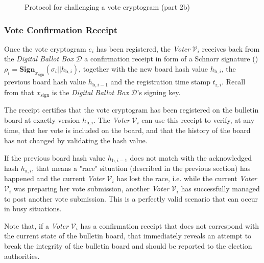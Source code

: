 \begin{landscape}
\begin{figure}[ht]
    \caption{Protocol for challenging a vote cryptogram (part 2b)}
    \label{fig: protocol for challenging a vote cryptogram part 2b}
\end{figure}
\clearpage
\end{landscape}


\clearpage
\subsubsection{Vote Confirmation Receipt} \label{sec: vote confirmation receipt}
Once the vote cryptogram $e_i$ has been registered, the \textit{Voter} $\mathcal{V}_i$ receives back from the \textit{Digital Ballot Box} $\mathcal{D}$ a confirmation receipt in form of a Schnorr signature () \( \rho_i = \mathbf{Sign}_{x_\mathrm{sign}} (\sigma_i || h_{\mathrm{b},i}) \), together with the new board hash value $h_{\mathrm{b},i}$, the previous board hash value $h_{\mathrm{b},i-1}$ and the registration time stamp $t_{\mathrm{r},i}$. Recall from  that $x_\mathrm{sign}$ is the \textit{Digital Ballot Box} $\mathcal{D}$'s signing key.

The receipt certifies that the vote cryptogram has been registered on the bulletin board at exactly version $h_{\mathrm{b},i}$. The \textit{Voter} $\mathcal{V}_i$ can use this receipt to verify, at any time, that her vote is included on the board, and that the history of the board has not changed by validating the hash value. 

If the previous board hash value $h_{\mathrm{b},i-1}$ does not match with the acknowledged hash $h_{\mathrm{a},i}$, that means a "race" situation (described in the previous section) has happened and the current \textit{Voter} $\mathcal{V}_i$ has lost the race, i.e. while the current \textit{Voter} $\mathcal{V}_i$ was preparing her vote submission, another \textit{Voter} $\mathcal{V}_i$ has successfully managed to post another vote submission. This is a perfectly valid scenario that can occur in busy situations.

Note that, if a \textit{Voter} $\mathcal{V}_i$ has a confirmation receipt that does not correspond with the current state of the bulletin board, that immediately reveals an attempt to break the integrity of the bulletin board and should be reported to the election authorities.

